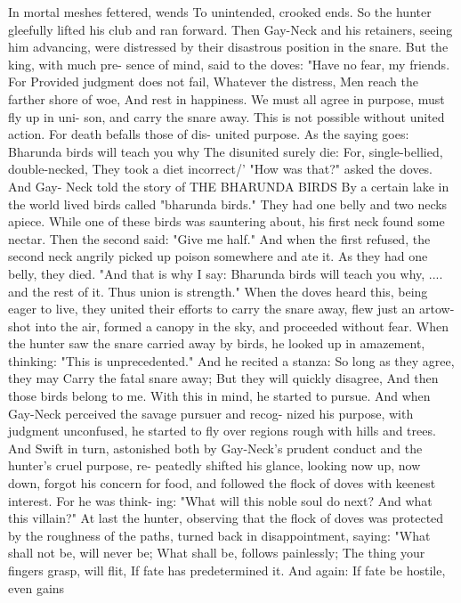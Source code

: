\documentclass{book}
\begin{document}
In mortal meshes fettered, wends
To unintended, crooked ends.
So the hunter gleefully lifted his club and ran
forward. Then Gay-Neck and his retainers, seeing
him advancing, were distressed by their disastrous
position in the snare. But the king, with much pre-
sence of mind, said to the doves: "Have no fear, my
friends. For
Provided judgment does not fail,
Whatever the distress,
Men reach the farther shore of woe,
And rest in happiness.
We must all agree in purpose, must fly up in uni-
son, and carry the snare away. This is not possible
without united action. For death befalls those of dis-
united purpose. As the saying goes:
Bharunda birds will teach you why
The disunited surely die:
For, single-bellied, double-necked,
They took a diet incorrect/'
"How was that?" asked the doves. And Gay-
Neck told the story of
THE BHARUNDA BIRDS
By a certain lake in the world lived birds called
"bharunda birds." They had one belly and two necks
apiece.
While one of these birds was sauntering about, his
first neck found some nectar. Then the second said:
"Give me half." And when the first refused, the
second neck angrily picked up poison somewhere and
ate it. As they had one belly, they died.
"And that is why I say:
Bharunda birds will teach you why, ....
and the rest of it. Thus union is strength."
When the doves heard this, being eager to live,
they united their efforts to carry the snare away, flew
just an artow-shot into the air, formed a canopy in
the sky, and proceeded without fear.
When the hunter saw the snare carried away by
birds, he looked up in amazement, thinking: "This
is unprecedented." And he recited a stanza:
So long as they agree, they may
Carry the fatal snare away;
But they will quickly disagree,
And then those birds belong to me.
With this in mind, he started to pursue. And when
Gay-Neck perceived the savage pursuer and recog-
nized his purpose, with judgment unconfused, he
started to fly over regions rough with hills and trees.
And Swift in turn, astonished both by Gay-Neck's
prudent conduct and the hunter's cruel purpose, re-
peatedly shifted his glance, looking now up, now
down, forgot his concern for food, and followed the
flock of doves with keenest interest. For he was think-
ing: "What will this noble soul do next? And what
this villain?" At last the hunter, observing that the
flock of doves was protected by the roughness of the
paths, turned back in disappointment, saying:
"What shall not be, will never be;
What shall be, follows painlessly;
The thing your fingers grasp, will flit,
If fate has predetermined it.
And again:
If fate be hostile, even gains
\end{document}
